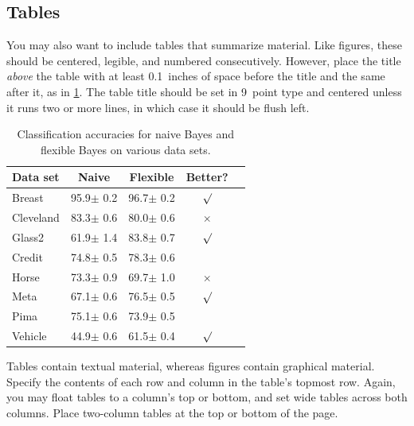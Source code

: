 \documentclass{article}
\theoremstyle{plain}
\theoremstyle{definition}
\theoremstyle{remark}
\begin{document}
\subsection{Tables}

You may also want to include tables that summarize material. Like figures,
these should be centered, legible, and numbered consecutively. However, place
the title \emph{above} the table with at least 0.1~inches of space before the
title and the same after it, as in \cref{sample-table}. The table title should
be set in 9~point type and centered unless it runs two or more lines, in which
case it should be flush left.


\begin{table}[t]
  \caption{Classification accuracies for naive Bayes and flexible
    Bayes on various data sets.}
  \label{sample-table}
  \begin{center}
    \begin{small}
      \begin{sc}
        \begin{tabular}{lcccr}
          \toprule
          Data set  & Naive         & Flexible      & Better?  \\
          \midrule
          Breast    & 95.9$\pm$ 0.2 & 96.7$\pm$ 0.2 & $\surd$  \\
          Cleveland & 83.3$\pm$ 0.6 & 80.0$\pm$ 0.6 & $\times$ \\
          Glass2    & 61.9$\pm$ 1.4 & 83.8$\pm$ 0.7 & $\surd$  \\
          Credit    & 74.8$\pm$ 0.5 & 78.3$\pm$ 0.6 &          \\
          Horse     & 73.3$\pm$ 0.9 & 69.7$\pm$ 1.0 & $\times$ \\
          Meta      & 67.1$\pm$ 0.6 & 76.5$\pm$ 0.5 & $\surd$  \\
          Pima      & 75.1$\pm$ 0.6 & 73.9$\pm$ 0.5 &          \\
          Vehicle   & 44.9$\pm$ 0.6 & 61.5$\pm$ 0.4 & $\surd$  \\
          \bottomrule
        \end{tabular}
      \end{sc}
    \end{small}
  \end{center}
  \vskip -0.1in
\end{table}

Tables contain textual material, whereas figures contain graphical material.
Specify the contents of each row and column in the table's topmost row. Again,
you may float tables to a column's top or bottom, and set wide tables across
both columns. Place two-column tables at the top or bottom of the page.
\end{document}
